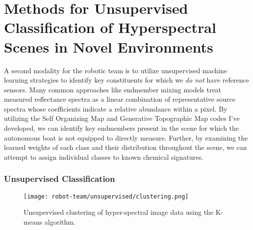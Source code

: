 \section{Methods for Unsupervised Classification of Hyperspectral Scenes in Novel Environments}

A second modality for the robotic team is to utilize unsupervised machine learning strategies to identify key constituents for which we \textit{do not} have reference sensors. Many common approaches like endmember mixing models treat measured reflectance spectra as a linear combination of representative source spectra whose coefficients indicate a relative abundance within a pixel. By utilizing the Self Organizing Map and Generative Topographic Map codes I've developed, we can identify key endmembers present in the scene for which the autonomous boat is not equipped to directly measure. Further, by examining the learned weights of each class and their distribution throughout the scene, we can attempt to assign individual classes to known chemical signatures.

\subsubsection{Unsupervised Classification}
\begin{figure}[h]
  \texttt{[image: robot-team/unsupervised/clustering.png]}
  \caption{Unsupervised clustering of hyper-spectral image data using the K-means algorithm.\label{clustering}}
\end{figure}




